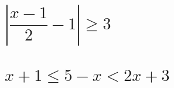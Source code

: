 \documentclass[template=tabling,81pt,headonall]{azmoon}
\begin{document}
\begin{questions}
{\begin{LTR}
\begin{parts}
\part{$|\dfrac{x-1}{2}-1| \geq 3$}
\part{$x+1 \leq 5-x < 2x +3$}
\end{parts}
\end{LTR}
        
    }\end{questions}
    
\end{document}
